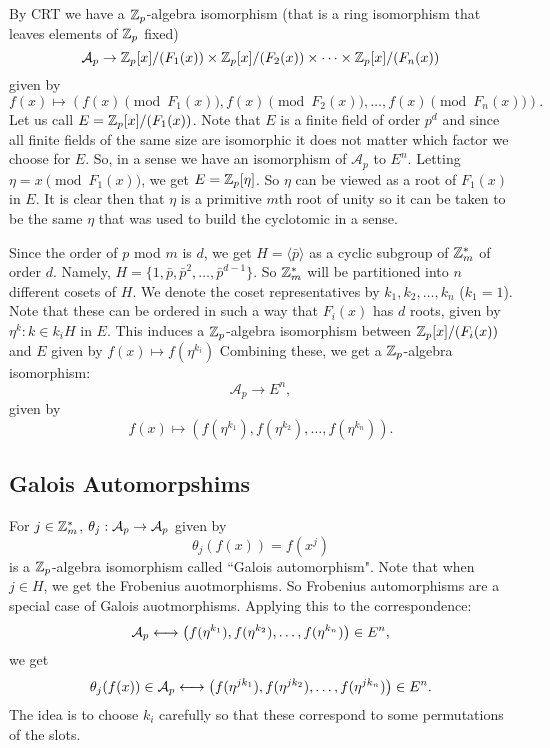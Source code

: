 \documentclass[12pt]{article}
\theoremstyle{plain}
\theoremstyle{definition}
\theoremstyle{remark}
\begin{document}
By CRT we have a $\mathbb{Z}_p$-algebra isomorphism (that is a ring isomorphism that leaves elements of $\mathbb{Z}_p$ fixed)
$$\mathcal{A}_p \rightarrow \mathbb{Z}_p[x]/(F_1(x))\times \mathbb{Z}_p[x]/(F_2(x)) \times \dots \times \mathbb{Z}_p[x]/(F_n(x))$$ given by 
$$f(x)\mapsto \left (f(x) \pmod{F_1(x)}, f(x) \pmod{F_2(x)}, \dots, f(x) \pmod{F_n(x)}\right).$$
Let us call $E = \mathbb{Z}_p[x]/(F_1(x))$. Note that $E$ is a finite field of order $p^d$ and since all finite fields of the same size are isomorphic it does not matter which factor we choose for $E$. So, in a sense we have an isomorphism of $\mathcal{A}_p$ to $E^n$. 
Letting $\eta = x \pmod{F_1(x)}$, we get $E=\mathbb{Z}_p[\eta]$. So $\eta$ can be viewed as a root of $F_1(x)$ in $E$. It is clear then that $\eta$ is a primitive $m$th root of unity so it can be taken to be the same $\eta$ that was used to build the cyclotomic in a sense.

Since the order of $p$ mod $m$ is $d$, we get $H=\langle \bar{p}\rangle$ as a cyclic subgroup of $\mathbb{Z}_m^*$ of order $d$. Namely, $H=\{1, \bar{p}, \bar{p}^2, \dots, \bar{p}^{d-1}\}$. 
So $\mathbb{Z}_m^*$ will be partitioned into $n$ different cosets of $H$. We denote the coset representatives by $k_1, k_2, \dots, k_n$ ($k_1=1$). Note that these can be ordered in such a way that $F_i(x)$ has $d$ roots, given by $\eta^k : k\in k_iH$ in $E$. 
This induces a $\mathbb{Z}_p$-algebra isomorphism between 
$\mathbb{Z}_p[x]/(F_i(x))$ and $E$ given by $f(x) \mapsto f(\eta^{k_i})$
Combining these, we get a $\mathbb{Z}_p$-algebra isomorphism:
$$\mathcal{A}_p\rightarrow E^n,$$ given by 
$$f(x) \mapsto \left (f(\eta^{k_1}), f(\eta^{k_2}), \dots, f(\eta^{k_n})\right ).$$

\subsection{Galois Automorpshims}
For $j\in \mathbb{Z}_m^*$, $\theta_j:\mathcal{A}_p\rightarrow \mathcal{A}_p$ given by 
$$\theta_j(f(x)) = f(x^j)$$ is a $\mathbb{Z}_p$-algebra isomorphism called ``Galois automorphism". Note that when $j\in H$, we get the Frobenius auotmorphisms. So Frobenius automorphisms are a special case of Galois auotmorphisms.
Applying this to the correspondence:
$$\mathcal{A}_p \longleftrightarrow \left (f(\eta^{k_1}), f(\eta^{k_2}), \dots, f(\eta^{k_n})\right ) \in E^n,$$ we get
$$\theta_j(f(x)) \in \mathcal{A}_p \longleftrightarrow \left (f(\eta^{jk_1}), f(\eta^{jk_2}), \dots, f(\eta^{jk_n})\right )\in E^n.$$
The idea is to choose $k_i$ carefully so that these correspond to some permutations of the slots. 
\end{document}
